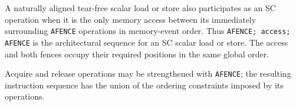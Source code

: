 A naturally aligned tear-free scalar load or store also participates as an SC operation when it is the only memory
access between its immediately surrounding \texttt{AFENCE} operations in memory-event order. Thus
\texttt{AFENCE; access; AFENCE} is the architectural sequence for an SC scalar load or store. The access and both
fences occupy their required positions in the same global order.

Acquire and release operations may be strengthened with \texttt{AFENCE}; the resulting instruction sequence has the
union of the ordering constraints imposed by its operations.
